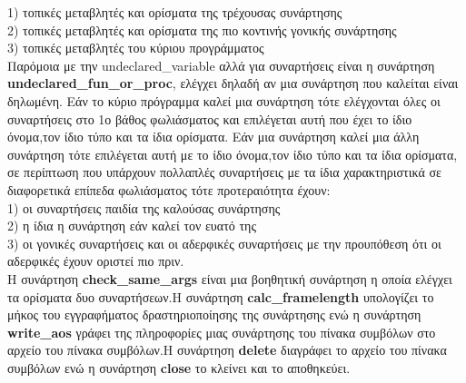 \documentclass[12pt,a4paper,a4paper]{report}
\begin{document}
1) τοπικές μεταβλητές και ορίσματα της τρέχουσας συνάρτησης\\
2) τοπικές μεταβλητές και ορίσματα της πιο κοντινής γονικής συνάρτησης\\
3) τοπικές μεταβλητές του κύριου προγράμματος\\
Παρόμοια με την undeclared\_variable αλλά για συναρτήσεις είναι η συνάρτηση \textbf{undeclared\_fun\_or\_proc}, ελέγχει δηλαδή αν μια συνάρτηση που καλείται είναι δηλωμένη. Εάν το κύριο πρόγραμμα καλεί μια συνάρτηση τότε ελέγχονται όλες οι συναρτήσεις στο 1ο βάθος φωλιάσματος και επιλέγεται αυτή που έχει το ίδιο όνομα,τον ίδιο τύπο και τα ίδια ορίσματα. Εάν μια συνάρτηση καλεί μια άλλη συνάρτηση τότε επιλέγεται αυτή με το ίδιο όνομα,τον ίδιο τύπο και τα ίδια ορίσματα, σε περίπτωση που υπάρχουν πολλαπλές συναρτήσεις με τα ίδια χαρακτηριστικά σε διαφορετικά επίπεδα φωλιάσματος τότε προτεραιότητα έχουν:\\
1) οι συναρτήσεις παιδία της καλούσας συνάρτησης\\
2) η ίδια η συνάρτηση εάν καλεί τον ευατό της\\
3) οι γονικές συναρτήσεις και οι αδερφικές συναρτήσεις με την προυπόθεση ότι οι αδερφικές έχουν οριστεί πιο πριν.\\
H συνάρτηση \textbf{check\_same\_args} είναι μια βοηθητική συνάρτηση η οποία ελέγχει τα ορίσματα δυο συναρτήσεων.Η συνάρτηση \textbf{calc\_framelength} υπολογίζει το μήκος του εγγραφήματος δραστηριοποίησης της συνάρτησης ενώ η συνάρτηση \textbf{write\_aos} γράφει της πληροφορίες μιας συνάρτησης του πίνακα συμβόλων στο αρχείο του πίνακα συμβόλων.Η συνάρτηση \textbf{delete} διαγράφει το αρχείο του πίνακα συμβόλων ενώ η συνάρτηση \textbf{close} το κλείνει και το αποθηκεύει.\\
\end{document}
